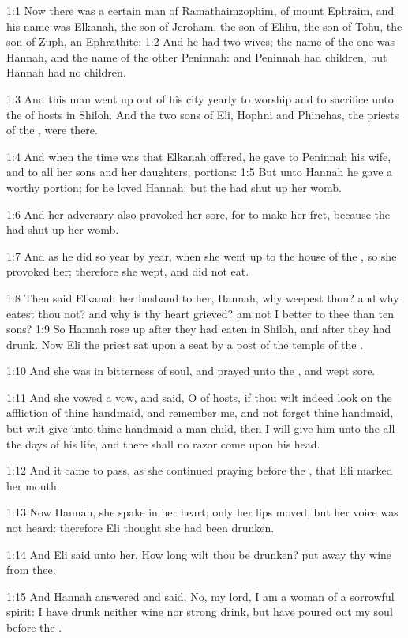 
1:1 Now there was a certain man of Ramathaimzophim, of mount Ephraim, and his name was Elkanah, the son of Jeroham, the son of Elihu, the son of Tohu, the son of Zuph, an Ephrathite: 1:2 And he had two wives; the name of the one was Hannah, and the name of the other Peninnah: and Peninnah had children, but Hannah had no children.

1:3 And this man went up out of his city yearly to worship and to sacrifice unto the \LORD of hosts in Shiloh. And the two sons of Eli, Hophni and Phinehas, the priests of the \LORD, were there.

1:4 And when the time was that Elkanah offered, he gave to Peninnah his wife, and to all her sons and her daughters, portions: 1:5 But unto Hannah he gave a worthy portion; for he loved Hannah: but the \LORD had shut up her womb.

1:6 And her adversary also provoked her sore, for to make her fret, because the \LORD had shut up her womb.

1:7 And as he did so year by year, when she went up to the house of the \LORD, so she provoked her; therefore she wept, and did not eat.

1:8 Then said Elkanah her husband to her, Hannah, why weepest thou?  and why eatest thou not? and why is thy heart grieved? am not I better to thee than ten sons?  1:9 So Hannah rose up after they had eaten in Shiloh, and after they had drunk. Now Eli the priest sat upon a seat by a post of the temple of the \LORD.

1:10 And she was in bitterness of soul, and prayed unto the \LORD, and wept sore.

1:11 And she vowed a vow, and said, O \LORD of hosts, if thou wilt indeed look on the affliction of thine handmaid, and remember me, and not forget thine handmaid, but wilt give unto thine handmaid a man child, then I will give him unto the \LORD all the days of his life, and there shall no razor come upon his head.

1:12 And it came to pass, as she continued praying before the \LORD, that Eli marked her mouth.

1:13 Now Hannah, she spake in her heart; only her lips moved, but her voice was not heard: therefore Eli thought she had been drunken.

1:14 And Eli said unto her, How long wilt thou be drunken? put away thy wine from thee.

1:15 And Hannah answered and said, No, my lord, I am a woman of a sorrowful spirit: I have drunk neither wine nor strong drink, but have poured out my soul before the \LORD.

